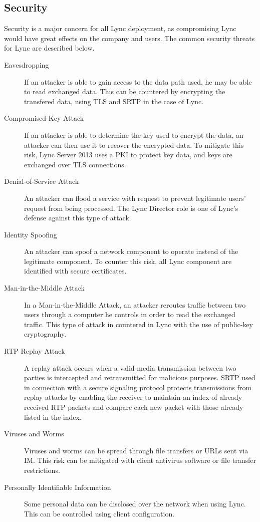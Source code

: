 \subsection{Security}
Security is a major concern for all Lync deployment, as compromising Lync would have great effects on the company and users. The common security threats for Lync are described below\cite{microsoft_technet_common_2013}.

\begin{description}
\item[Eavesdropping] If an attacker is able to gain access to the data path used, he may be able to read exchanged data. This can be countered by encrypting the transfered data, using TLS and SRTP in the case of Lync.

\item[Compromised-Key Attack] If an attacker is able to determine the key used to encrypt the data, an attacker can then use it to recover the encrypted data. To mitigate this risk, Lync Server 2013 uses a PKI to protect key data, and keys are exchanged over TLS connections.

\item[Denial-of-Service Attack] An attacker can flood a service with request to prevent legitimate users' request from being processed. The Lync Director role is one of Lync's defense against this type of attack.

\item[Identity Spoofing] An attacker can spoof a network component to operate instead of the legitimate component. To counter this risk, all Lync component are identified with secure certificates.

\item[Man-in-the-Middle Attack] In a Man-in-the-Middle Attack, an attacker reroutes traffic between two users through a computer he controls in order to read the exchanged traffic. This type of attack in countered in Lync with the use of public-key cryptography.

\item[RTP Replay Attack] A replay attack occurs when a valid media transmission between two parties is intercepted and retransmitted for malicious purposes. SRTP used in connection with a secure signaling protocol protects transmissions from replay attacks by enabling the receiver to maintain an index of already received RTP packets and compare each new packet with those already listed in the index.

\item[Viruses and Worms] Viruses and worms can be spread through file transfers or URLs sent via IM. This risk can be mitigated with client antivirus software or file transfer restrictions.

\item[Personally Identifiable Information] Some personal data can be disclosed over the network when using Lync. This can be controlled using client configuration.

\end{description}




